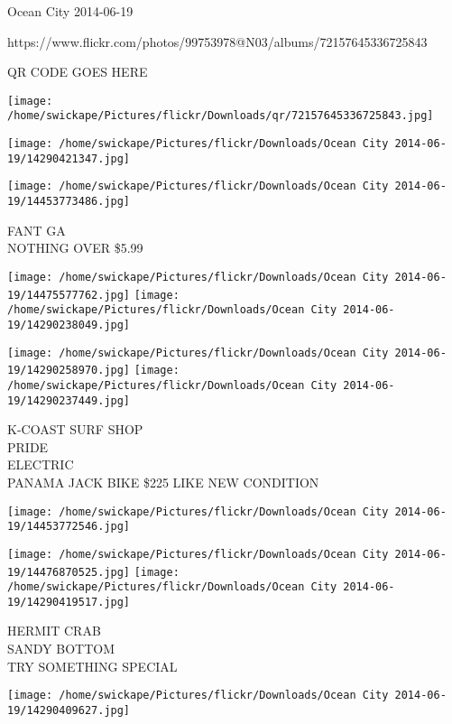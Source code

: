 \documentclass[10pt,letterpaper]{article}
\begin{document}
Ocean City 2014-06-19

https://www.flickr.com/photos/99753978@N03/albums/72157645336725843

QR CODE GOES HERE

\texttt{[image: /home/swickape/Pictures/flickr/Downloads/qr/72157645336725843.jpg]}
\pagebreak

\texttt{[image: /home/swickape/Pictures/flickr/Downloads/Ocean City 2014-06-19/14290421347.jpg]}

\vspace{0.25in}
\texttt{[image: /home/swickape/Pictures/flickr/Downloads/Ocean City 2014-06-19/14453773486.jpg]}

FANT GA\\
NOTHING OVER \$5.99\\
\pagebreak

\texttt{[image: /home/swickape/Pictures/flickr/Downloads/Ocean City 2014-06-19/14475577762.jpg]}
\texttt{[image: /home/swickape/Pictures/flickr/Downloads/Ocean City 2014-06-19/14290238049.jpg]}

\texttt{[image: /home/swickape/Pictures/flickr/Downloads/Ocean City 2014-06-19/14290258970.jpg]}
\texttt{[image: /home/swickape/Pictures/flickr/Downloads/Ocean City 2014-06-19/14290237449.jpg]}

K{-}COAST SURF SHOP\\
PRIDE\\
ELECTRIC\\
PANAMA JACK BIKE \$225 LIKE NEW CONDITION\\
\pagebreak

\texttt{[image: /home/swickape/Pictures/flickr/Downloads/Ocean City 2014-06-19/14453772546.jpg]}

\vspace{0.25in}
\texttt{[image: /home/swickape/Pictures/flickr/Downloads/Ocean City 2014-06-19/14476870525.jpg]}
\texttt{[image: /home/swickape/Pictures/flickr/Downloads/Ocean City 2014-06-19/14290419517.jpg]}

HERMIT CRAB\\
SANDY BOTTOM\\
TRY SOMETHING SPECIAL\\
\pagebreak

\texttt{[image: /home/swickape/Pictures/flickr/Downloads/Ocean City 2014-06-19/14290409627.jpg]}
\end{document}
